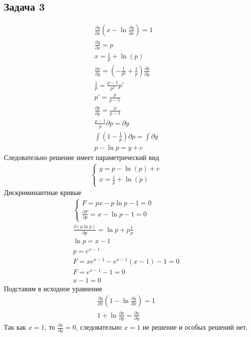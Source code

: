	
\newpage	
\subsection*{Задача 3}
	\begin{gather*}
		\frac{\partial y}{\partial x} \left(x - \ln \frac{\partial y}{\partial x}\right) = 1\\
		\frac{\partial y}{\partial x} = p\\
		x = \frac{1}{p} + \ln\left(p\right)\\
		\frac{\partial x}{\partial y} = \left(-\frac{1}{p^2} + \frac{1}{p}\right) \frac{\partial p}{\partial y}\\
		\frac{1}{p} = \frac{p - 1}{p^2} p'\\
		p'= \frac{p}{p-1}\\
		\frac{\partial p}{\partial y} = \frac{p}{p - 1}\\
		\frac{p - 1}{p} \partial p = \partial y\\
		\int \left(1 - \frac{1}{p}\right) \partial p = \int \partial y\\
		p - \ln p = y + c
	\end{gather*}
	Следовательно решение имеет параметрический вид
	\begin{gather*}
	\begin{cases}
		y = p - \ln\left(p\right) + c\\
		x = \frac{1}{p} + \ln\left(p\right)
	\end{cases}
	\end{gather*}
	Дискриминантные кривые
	\begin{gather*}
		\begin{cases}
			F = px - p\ln p -1 = 0\\
			\frac{\partial F}{\partial p} = x - \ln p - 1 = 0
		\end{cases}\\
		\frac{\partial \left(p\ln p\right)}{\partial p} = \ln p + p \frac{1}{p}\\
		\ln p = x - 1\\
		p = e^{x - 1}\\
		F = xe^{x-1} - e^{x-1}\left(x-1\right) -1 = 0\\
		F = e^{x-1} - 1 = 0\\
		x - 1 = 0
	\end{gather*}
	Подставим в исходное уравнение
	\begin{gather*}
		\frac{\partial y}{\partial x} \left(1 - \ln \frac{\partial y}{\partial x}\right) = 1\\
		1 + \ln \frac{\partial x}{\partial y} = \frac{\partial x}{\partial y}
	\end{gather*}
	Так как $x = 1$, то $\frac{\partial x}{\partial y} = 0$, следовательно $x = 1$ не решение и особых решений нет.
	
